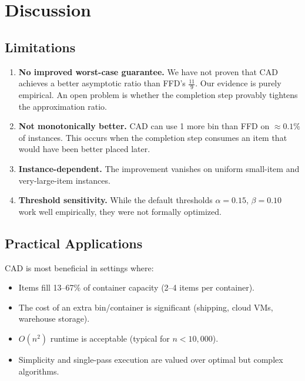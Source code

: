 \documentclass[11pt]{article}
\begin{document}
\section{Discussion}

\subsection{Limitations}

\begin{enumerate}[nosep]
  \item \textbf{No improved worst-case guarantee.} We have not proven that CAD achieves a
        better asymptotic ratio than FFD's $\frac{11}{9}$. Our evidence is purely
        empirical. An open problem is whether the completion step provably tightens the
        approximation ratio.
  \item \textbf{Not monotonically better.} CAD can use 1 more bin than FFD on $\approx 0.1\%$
        of instances. This occurs when the completion step consumes an item that would
        have been better placed later.
  \item \textbf{Instance-dependent.} The improvement vanishes on uniform small-item and
        very-large-item instances.
  \item \textbf{Threshold sensitivity.} While the default thresholds $\alpha = 0.15$,
        $\beta = 0.10$ work well empirically, they were not formally optimized.
\end{enumerate}

\subsection{Practical Applications}

CAD is most beneficial in settings where:
\begin{itemize}[nosep]
  \item Items fill 13--67\% of container capacity (2--4 items per container).
  \item The cost of an extra bin/container is significant (shipping, cloud VMs, warehouse storage).
  \item $O(n^2)$ runtime is acceptable (typical for $n < 10{,}000$).
  \item Simplicity and single-pass execution are valued over optimal but complex algorithms.
\end{itemize}
\end{document}
